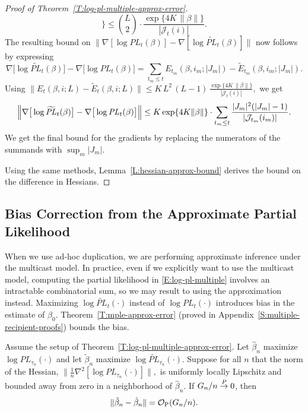 \documentclass[aoas,preprint]{imsart}
\begin{document}
\begin{proof}[Proof of Theorem~\ref{T:log-pl-multiple-approx-error}]
\[    \Big\}
        \leq
        {L \choose 2}
        \cdot
        \frac{\exp\{4 K \, \| \beta \|\}}{| \mathcal{J}_t(i) |}.
\]
The resulting bound on 
\(
    \|
    \nabla [\log \mathit{PL}_{t}(\beta) ]
    -
    \nabla [\log \widetilde{\mathit{PL}}_{t}(\beta) ]
    \|
\)
now follows by expressing
\[
    \nabla \big[ \log \widetilde{\mathit{PL}}_t(\beta) \big]
    -
    \nabla \big[ \log \mathit{PL}_t(\beta )\big]
        =
        \sum_{t_m \leq t}
            E_{t_m}\!(\beta, i_m; |J_m|)
            -
            \widetilde{E}_{t_m}\!(\beta, i_m; |J_m|).
\]
Using
\(
    \big\| E_{t}(\beta, i; L) - \widetilde{E}_t(\beta, i; L) \big\|
        \leq
        K \, L^2 \, (L - 1)
        \,
        \frac{\exp\{4 K \, \| \beta \|\}}{| \mathcal{J}_t(i) |},
\)
we get
\[
    \Big\|
        \nabla\big[ \log \widetilde{\mathit{PL}}_t( \beta ) \big]
        -
        \nabla\big[ \log {\mathit{PL}}_t( \beta ) \big]
    \Big\| \\
        \leq
            K
            \exp\{4 K \| \beta \|\}
            \cdot
            \sum_{t_m \leq t}
                \frac{|J_m|^2(|J_m| - 1)}{|\mathcal{J}_{t_m}(i_m)|}.
\]
We get the final bound for the gradients by replacing the numerators of the 
summands with $\sup_m |J_m|$.

Using the same methods, Lemma~\ref{L:hessian-approx-bound} derives the bound 
on the difference in Hessians.
\end{proof}

\subsection{Bias Correction from the Approximate Partial Likelihood}
\label{S:approximation-bias}

When we use ad-hoc duplication, we are performing approximate inference
under the multicast model.  In practice, even if we explicitly want to use the
multicast model, computing the partial likelihood in \eqref{E:log-pl-multiple} 
involves an intractable combinatorial sum, so we may result to using the
approximation instead.  Maximizing $\log \widetilde{\mathit{PL}}_t(\cdot)$ 
instead of $\log \mathit{PL}_t(\cdot)$ introduces bias in the estimate of 
$\beta_0$.  Theorem~\ref{T:mple-approx-error} (proved in Appendix~\ref{S:multiple-recipient-proofs}) bounds the bias.

\begin{theorem}\label{T:mple-approx-error}
    Assume the setup of Theorem~\ref{T:log-pl-multiple-approx-error}.
    Let $\hat \beta_n$ maximize $\log \mathit{PL}_{\tau_n}(\cdot)$
    and let $\tilde \beta_n$ maximize
    $\log \widetilde{\mathit{PL}}_{\tau_n}(\cdot)$.
    Suppose for all $n$ that the norm of the Hessian,
    \(
        \|
        \tfrac{1}{n}
        \nabla^2
        [ \log \mathit{PL}_{\tau_n}(\cdot)]
        \|,
    \)
    is uniformly locally Lipschitz and bounded away from zero
    in a neighborhood of $\hat \beta_n$.
    If $G_n/n \overset{\mathit{P}}{\to} 0$, then
    \[
        \| \tilde \beta_{n} - \hat \beta_{n} \|
            =
            \mathcal{O}_\text{P}(G_n/n).
    \]
\end{theorem}
\end{document}

